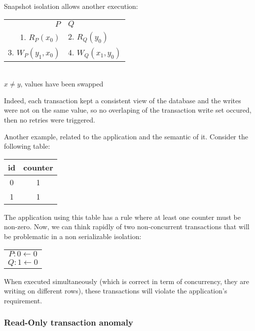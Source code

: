 Snapshot isolation allows another execution:

\begin{table}[H]
  \centering
  \begin{tabular}{ r  l }
    $P$ & $Q$ \\
    1. $R_P(x_0)$ & 2. $R_Q(y_0)$ \\
    3. $W_P(y_1, x_0)$ & 4. $W_Q(x_1, y_0)$ \\
  \end{tabular}
  \\
  $x \neq y$, values have been swapped
\end{table}

Indeed, each transaction kept a consistent view of the database and the writes were not on the same value, so no overlaping of the transaction write set occured, then no retries were triggered.

Another example, related to the application and the semantic of it. Consider the following table:

\begin{table}[H]
  \centering
  \begin{tabular}{ c | c }
    id & counter \\
        \hline
    0 & 1 \\
    1 & 1 \\
  \end{tabular}
\end{table}

The application using this table has a rule where at least one counter must be non-zero. Now, we can think rapidly of two non-concurrent transactions that will be problematic in a non serializable isolation:

\begin{table}[H]
  \centering
  \begin{tabular}{ c }
    $P:   0 \gets 0$\\
    $Q:   1 \gets 0$\\
  \end{tabular}
\end{table}

When executed simultaneously (which is correct in term of concurrency, they are writing on different rows), these transactions will violate the application's requirement.

\subsubsection{Read-Only transaction anomaly}


